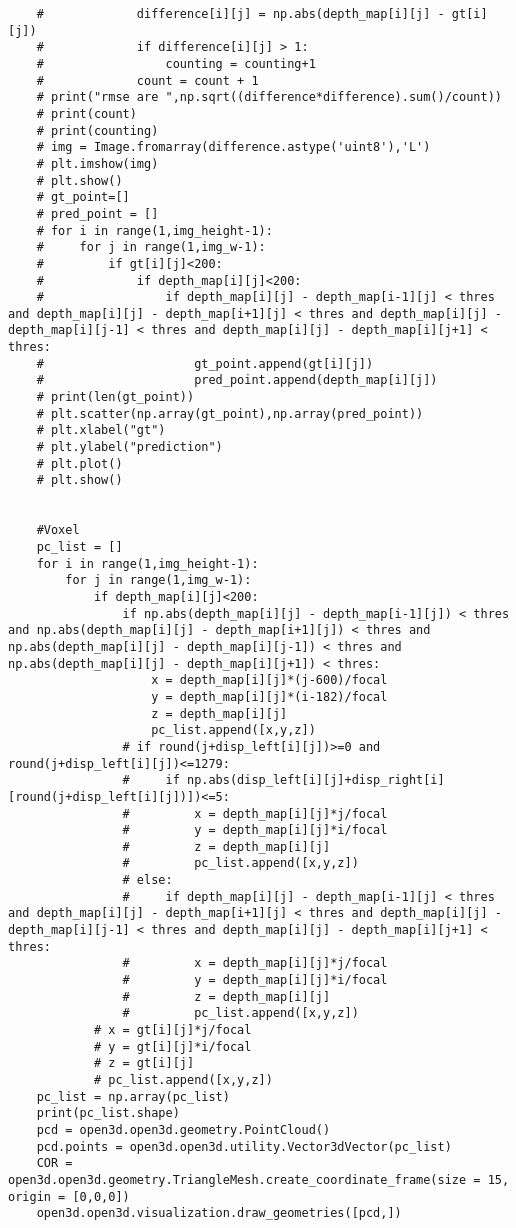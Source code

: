\begin{lstlisting}
    #             difference[i][j] = np.abs(depth_map[i][j] - gt[i][j])
    #             if difference[i][j] > 1:
    #                 counting = counting+1
    #             count = count + 1
    # print("rmse are ",np.sqrt((difference*difference).sum()/count))
    # print(count)
    # print(counting)
    # img = Image.fromarray(difference.astype('uint8'),'L')
    # plt.imshow(img)
    # plt.show()
    # gt_point=[]
    # pred_point = []
    # for i in range(1,img_height-1):
    #     for j in range(1,img_w-1):
    #         if gt[i][j]<200:
    #             if depth_map[i][j]<200:
    #                 if depth_map[i][j] - depth_map[i-1][j] < thres and depth_map[i][j] - depth_map[i+1][j] < thres and depth_map[i][j] - depth_map[i][j-1] < thres and depth_map[i][j] - depth_map[i][j+1] < thres:
    #                     gt_point.append(gt[i][j])
    #                     pred_point.append(depth_map[i][j])
    # print(len(gt_point))
    # plt.scatter(np.array(gt_point),np.array(pred_point))
    # plt.xlabel("gt")
    # plt.ylabel("prediction")
    # plt.plot()
    # plt.show()


    #Voxel
    pc_list = []
    for i in range(1,img_height-1):
        for j in range(1,img_w-1):
            if depth_map[i][j]<200:
                if np.abs(depth_map[i][j] - depth_map[i-1][j]) < thres and np.abs(depth_map[i][j] - depth_map[i+1][j]) < thres and np.abs(depth_map[i][j] - depth_map[i][j-1]) < thres and np.abs(depth_map[i][j] - depth_map[i][j+1]) < thres:
                    x = depth_map[i][j]*(j-600)/focal
                    y = depth_map[i][j]*(i-182)/focal
                    z = depth_map[i][j]
                    pc_list.append([x,y,z])
                # if round(j+disp_left[i][j])>=0 and round(j+disp_left[i][j])<=1279:
                #     if np.abs(disp_left[i][j]+disp_right[i][round(j+disp_left[i][j])])<=5:
                #         x = depth_map[i][j]*j/focal
                #         y = depth_map[i][j]*i/focal
                #         z = depth_map[i][j]
                #         pc_list.append([x,y,z])
                # else:
                #     if depth_map[i][j] - depth_map[i-1][j] < thres and depth_map[i][j] - depth_map[i+1][j] < thres and depth_map[i][j] - depth_map[i][j-1] < thres and depth_map[i][j] - depth_map[i][j+1] < thres:
                #         x = depth_map[i][j]*j/focal
                #         y = depth_map[i][j]*i/focal
                #         z = depth_map[i][j]
                #         pc_list.append([x,y,z])
            # x = gt[i][j]*j/focal
            # y = gt[i][j]*i/focal
            # z = gt[i][j]
            # pc_list.append([x,y,z])
    pc_list = np.array(pc_list)
    print(pc_list.shape)
    pcd = open3d.open3d.geometry.PointCloud()
    pcd.points = open3d.open3d.utility.Vector3dVector(pc_list)
    COR = open3d.open3d.geometry.TriangleMesh.create_coordinate_frame(size = 15, origin = [0,0,0])
    open3d.open3d.visualization.draw_geometries([pcd,])


\end{lstlisting}
